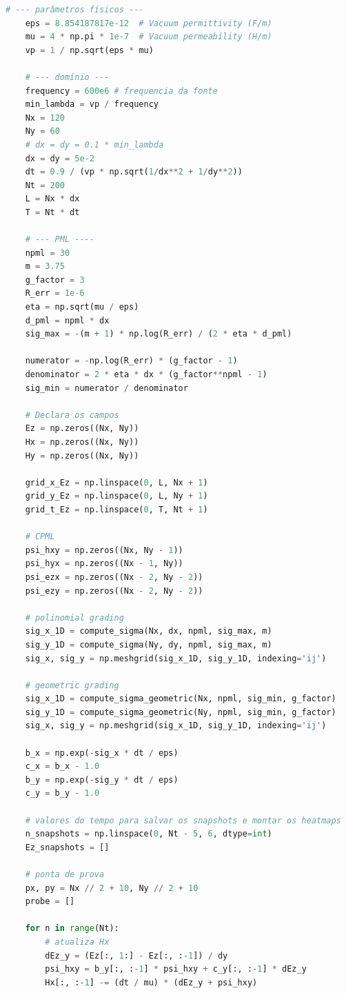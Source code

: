 \begin{anexosenv}
\begin{lstlisting}[language=Python, breaklines=true, basicstyle=\tiny]
    # --- parâmetros físicos ---
    eps = 8.854187817e-12  # Vacuum permittivity (F/m)
    mu = 4 * np.pi * 1e-7  # Vacuum permeability (H/m)
    vp = 1 / np.sqrt(eps * mu)

    # --- domínio ---
    frequency = 600e6 # frequencia da fonte
    min_lambda = vp / frequency
    Nx = 120
    Ny = 60 
    # dx = dy = 0.1 * min_lambda       
    dx = dy = 5e-2  
    dt = 0.9 / (vp * np.sqrt(1/dx**2 + 1/dy**2))
    Nt = 200         
    L = Nx * dx
    T = Nt * dt

    # --- PML ----
    npml = 30               
    m = 3.75            
    g_factor = 3
    R_err = 1e-6         
    eta = np.sqrt(mu / eps)
    d_pml = npml * dx
    sig_max = -(m + 1) * np.log(R_err) / (2 * eta * d_pml)

    numerator = -np.log(R_err) * (g_factor - 1)
    denominator = 2 * eta * dx * (g_factor**npml - 1)
    sig_min = numerator / denominator

    # Declara os campos
    Ez = np.zeros((Nx, Ny))
    Hx = np.zeros((Nx, Ny))
    Hy = np.zeros((Nx, Ny))

    grid_x_Ez = np.linspace(0, L, Nx + 1)
    grid_y_Ez = np.linspace(0, L, Ny + 1)
    grid_t_Ez = np.linspace(0, T, Nt + 1)

    # CPML
    psi_hxy = np.zeros((Nx, Ny - 1))
    psi_hyx = np.zeros((Nx - 1, Ny))
    psi_ezx = np.zeros((Nx - 2, Ny - 2))
    psi_ezy = np.zeros((Nx - 2, Ny - 2))

    # polinomial grading
    sig_x_1D = compute_sigma(Nx, dx, npml, sig_max, m)
    sig_y_1D = compute_sigma(Ny, dy, npml, sig_max, m)
    sig_x, sig_y = np.meshgrid(sig_x_1D, sig_y_1D, indexing='ij')

    # geometric grading
    sig_x_1D = compute_sigma_geometric(Nx, npml, sig_min, g_factor)
    sig_y_1D = compute_sigma_geometric(Ny, npml, sig_min, g_factor)
    sig_x, sig_y = np.meshgrid(sig_x_1D, sig_y_1D, indexing='ij')

    b_x = np.exp(-sig_x * dt / eps)
    c_x = b_x - 1.0
    b_y = np.exp(-sig_y * dt / eps)
    c_y = b_y - 1.0

    # valores do tempo para salvar os snapshots e montar os heatmaps
    n_snapshots = np.linspace(0, Nt - 5, 6, dtype=int)
    Ez_snapshots = []

    # ponta de prova
    px, py = Nx // 2 + 10, Ny // 2 + 10
    probe = []

    for n in range(Nt):
        # atualiza Hx
        dEz_y = (Ez[:, 1:] - Ez[:, :-1]) / dy
        psi_hxy = b_y[:, :-1] * psi_hxy + c_y[:, :-1] * dEz_y
        Hx[:, :-1] -= (dt / mu) * (dEz_y + psi_hxy)


\end{lstlisting}
\end{anexosenv}
